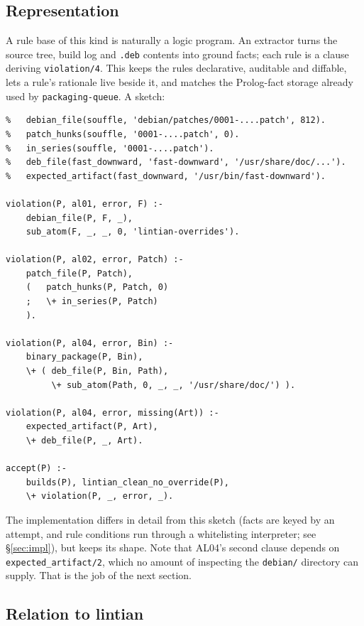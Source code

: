 \documentclass[11pt]{article}
\newcommand{\file}[1]{\texttt{#1}}
\begin{document}
\subsection{Representation}

A rule base of this kind is naturally a logic program. An extractor turns
the source tree, build log and \file{.deb} contents into ground facts; each
rule is a clause deriving \texttt{violation/4}. This keeps the rules
declarative, auditable and diffable, lets a rule's rationale live beside
it, and matches the Prolog-fact storage already used by
\texttt{packaging-queue}. A sketch:

\begin{lstlisting}[language=PrologSmall]
% Facts produced by the extractor, e.g.
%   debian_file(souffle, 'debian/patches/0001-....patch', 812).
%   patch_hunks(souffle, '0001-....patch', 0).
%   in_series(souffle, '0001-....patch').
%   deb_file(fast_downward, 'fast-downward', '/usr/share/doc/...').
%   expected_artifact(fast_downward, '/usr/bin/fast-downward').

violation(P, al01, error, F) :-
    debian_file(P, F, _),
    sub_atom(F, _, _, 0, 'lintian-overrides').

violation(P, al02, error, Patch) :-
    patch_file(P, Patch),
    (   patch_hunks(P, Patch, 0)
    ;   \+ in_series(P, Patch)
    ).

violation(P, al04, error, Bin) :-
    binary_package(P, Bin),
    \+ ( deb_file(P, Bin, Path),
         \+ sub_atom(Path, 0, _, _, '/usr/share/doc/') ).

violation(P, al04, error, missing(Art)) :-
    expected_artifact(P, Art),
    \+ deb_file(P, _, Art).

accept(P) :-
    builds(P), lintian_clean_no_override(P),
    \+ violation(P, _, error, _).
\end{lstlisting}

\noindent The implementation differs in detail from this sketch (facts are
keyed by an attempt, and rule conditions run through a whitelisting
interpreter; see \S\ref{sec:impl}), but keeps its shape.
Note that AL04's second clause depends on
\texttt{expected\_artifact/2}, which no amount of inspecting the
\file{debian/} directory can supply. That is the job of the next section.

\subsection{Relation to lintian}
\label{sec:lintian}
\end{document}
